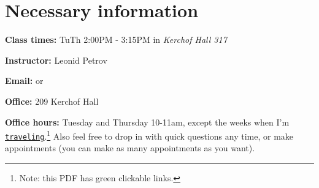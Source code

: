 \documentclass[oneside,11pt]{amsart}
\begin{document}
\section{Necessary information}
\bigskip

	\textbf{Class times:}   TuTh 2:00PM - 3:15PM in
	\emph{Kerchof Hall 317}

\medskip

\textbf{Instructor:} Leonid Petrov
\medskip

\textbf{Email:}  or 
\medskip

\textbf{Office:} 209 Kerchof Hall
\medskip

\textbf{Office hours:} 
Tuesday and Thursday 10-11am, except the weeks when I'm \href{https://lpetrov.cc/2018/05/travel-2019/}{\texttt{traveling}}.\footnote{Note:
this PDF has green clickable links.}
Also feel free to drop in with quick questions any time, or make 
appointments 
(you can make as many appointments as you want).
\end{document}
